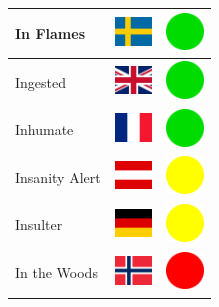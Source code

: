 \documentclass[12pt, a4paper, twoside]{report}
\begin{document}
\begin{center}
\begin{longtable}{|p{5cm}|p{2cm}|p{2cm}|}
In Flames & \includegraphics[width=1cm]{4x3/se} & \includegraphics[width=1cm]{likes/y} \\ \hline
Ingested & \includegraphics[width=1cm]{4x3/gb} & \includegraphics[width=1cm]{likes/y} \\ \hline
Inhumate & \includegraphics[width=1cm]{4x3/fr} & \includegraphics[width=1cm]{likes/y} \\ \hline
Insanity Alert & \includegraphics[width=1cm]{4x3/at} & \includegraphics[width=1cm]{likes/m} \\ \hline
Insulter & \includegraphics[width=1cm]{4x3/de} & \includegraphics[width=1cm]{likes/m} \\ \hline
In the Woods & \includegraphics[width=1cm]{4x3/no} & \includegraphics[width=1cm]{likes/n} \\ \hline

\end{longtable}
\end{center}
\end{document}
